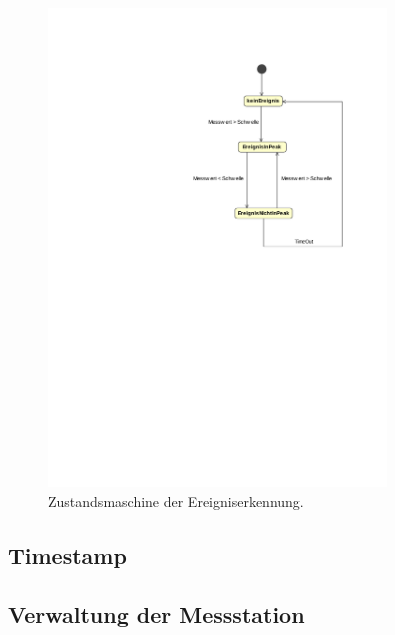 \begin{figure}[H]
	\centering
		\includegraphics[width=0.8\textwidth]{images/magicdraw/Ereigniserkennung.pdf}
	\caption{Zustandsmaschine der Ereigniserkennung.}
	\label{fig.fsm_impact_detection}
\end{figure}


\subsection{Timestamp}\label{subsec.sw_timestamp}

\subsection{Verwaltung der Messstation}\label{subsec.sw_busverwaltung}


